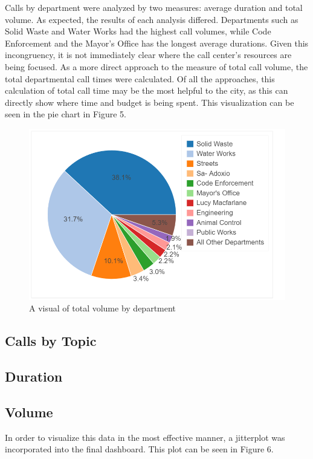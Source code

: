 \documentclass[11pt,twocolumn]{article}
\begin{document}
Calls by department were analyzed by two measures:  average duration and total volume.  As expected, the results of each analysis differed.  Departments such as Solid Waste and Water Works had the highest call volumes, while Code Enforcement and the Mayor's Office has the longest average durations.  Given this incongruency, it is not immediately clear where the call center's resources are being focused.  As a more direct approach to the measure of total call volume, the total departmental call times were calculated.  Of all the approaches, this calculation of total call time may be the most helpful to the city, as this can directly show where time and budget is being spent.  This visualization can be seen in the pie chart in Figure 5.

\begin{figure}[h]
  \includegraphics[scale=0.25]{piechart.png}
  \caption{A visual of total volume by department}
 \end{figure}


	\subsection{Calls by Topic}

\subsection{Duration}

\subsection{Volume}

In order to visualize this data in the most effective manner, a jitterplot was incorporated into the final dashboard.  This plot can be seen in Figure 6.
\end{document}
